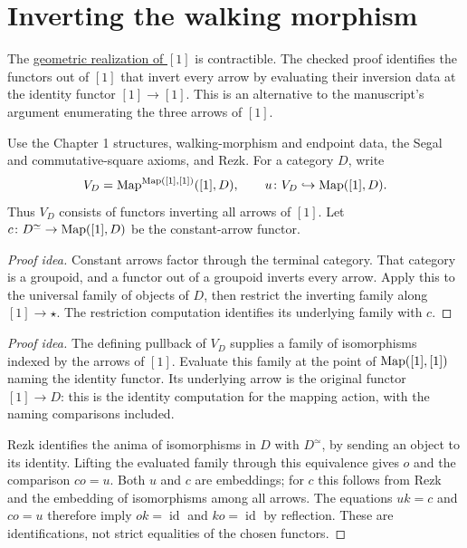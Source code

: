 \documentclass[11pt]{article}
\begin{document}
\section*{Inverting the walking morphism}

The \href{geometric-realizations.html}{geometric realization of $[1]$}
is contractible. The checked proof identifies the functors out of $[1]$
that invert every arrow by evaluating their inversion data at the identity
functor $[1]\to[1]$. This is an alternative to the manuscript's
argument enumerating the three arrows of $[1]$.

Use the Chapter 1 structures, walking-morphism and endpoint data,
the Segal and commutative-square axioms, and Rezk.
For a category $D$, write
\[
 V_D=\operatorname{Map}^{\operatorname{Map}([1],[1])}([1],D),\qquad
 u\colon V_D\hookrightarrow\operatorname{Map}([1],D).
\]
Thus $V_D$ consists of functors inverting all arrows of $[1]$.
Let $c\colon D^\simeq\to\operatorname{Map}([1],D)$ be the constant-arrow functor.

\begin{proof}[Proof idea]
Constant arrows factor through the terminal category. That category is a
groupoid, and a functor out of a groupoid inverts every arrow. Apply this
to the universal family of objects of $D$, then restrict the inverting
family along $[1]\to\star$. The restriction computation identifies its
underlying family with $c$.
\end{proof}

\begin{proof}[Proof idea]
The defining pullback of $V_D$ supplies a family of isomorphisms indexed
by the arrows of $[1]$. Evaluate this family at the point of
$\operatorname{Map}([1],[1])$ naming the identity functor. Its underlying arrow is the
original functor $[1]\to D$: this is the identity computation for the
mapping action, with the naming comparisons included.

Rezk identifies the anima of isomorphisms in $D$ with $D^\simeq$, by
sending an object to its identity. Lifting the evaluated family through
this equivalence gives $o$ and the comparison $co=u$.
Both $u$ and $c$ are embeddings; for $c$ this follows from Rezk and the
embedding of isomorphisms among all arrows. The equations $uk=c$ and
$co=u$ therefore imply $ok=\operatorname{id}$ and
$ko=\operatorname{id}$ by reflection. These are identifications, not
strict equalities of the chosen functors.
\end{proof}
\end{document}
